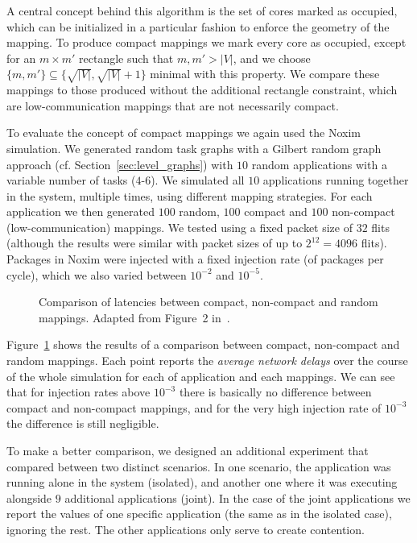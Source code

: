 A central concept behind this algorithm is the set of cores marked as occupied, which can be initialized in a particular fashion to enforce the geometry of the mapping.
To produce compact mappings we mark every core as occupied, except for an $m \times m'$ rectangle such that $m,m' > |V|$, and we choose $\{m,m'\} \subseteq \{ \sqrt{|V|}, \sqrt{|V|}+1\}$ minimal with this property.
We compare these mappings to those produced without the additional rectangle constraint, which are low-communication mappings that are not necessarily compact.

To evaluate the concept of compact mappings we again used the Noxim simulation.
We generated random task graphs with a Gilbert random graph approach (cf. Section~\ref{sec:level_graphs}) with $10$ random applications with a variable number of tasks ($4$-$6$).
We simulated all $10$ applications running together in the system, multiple times, using different mapping strategies. 
For each application we then generated $100$ random, $100$ compact and $100$ non-compact (low-communication) mappings. 
We tested using a fixed packet size of $32$ flits (although the results were similar with packet sizes of up to $2^{12} = 4096$ flits).
Packages in Noxim were injected with a fixed injection rate (of packages per cycle), which we also varied between $10^{-2}$ and $10^{-5}$. 

\begin{figure}[h]
	\centering
	\caption{Comparison of latencies between compact, non-compact and random mappings. Adapted from Figure~2 in~\cite{goens_samos19}.}
	\label{fig:compact_latency}
\end{figure}

Figure~\ref{fig:compact_latency} shows the results of a comparison between compact, non-compact and random mappings. 
Each point reports the \emph{average network delays} over the course of the whole simulation for each of application and each mappings. 
We can see that for injection rates above $10^{-3}$ there is basically no difference between compact and non-compact mappings, and for the very high injection rate of $10^{-3}$ the difference is still negligible.

To make a better comparison, we designed an additional experiment that compared between two distinct scenarios.
In one scenario, the application was running alone in the system (isolated), and another one where it was executing alongside $9$ additional applications (joint).
In the case of the joint applications we report the values of one specific application (the same as in the isolated case), ignoring the rest.
The other applications only serve to create contention.

